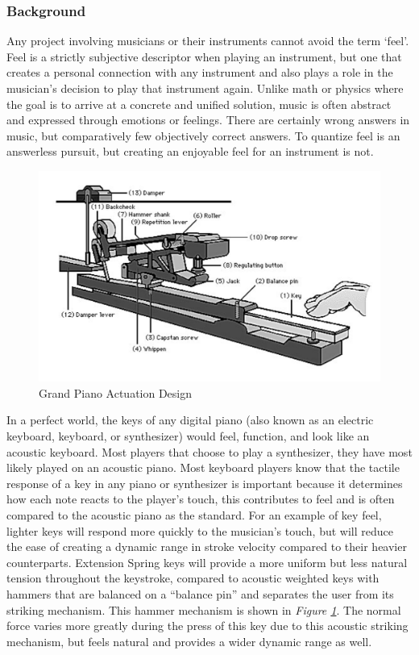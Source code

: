 \subsubsection{Background}

Any project involving musicians or their instruments cannot avoid the term ‘feel’. Feel is a strictly subjective descriptor when playing an instrument, but one that creates a personal connection with any instrument and also plays a role in the musician’s decision to play that instrument again. Unlike math or physics where the goal is to arrive at a concrete and unified solution, music is often abstract and expressed through emotions or feelings. There are certainly wrong answers in music, but comparatively few objectively correct answers. To quantize feel is an answerless pursuit, but creating an enjoyable feel for an instrument is not.

\begin{figure}[h!]
  \centering
  \includegraphics[width=\linewidth]{image/KeyMechanism.png}
  \caption{Grand Piano Actuation Design}
  \label{fig:key_mechanism}
\end{figure}

In a perfect world, the keys of any digital piano (also known as an electric keyboard, keyboard, or synthesizer) would feel, function, and look like an acoustic keyboard. Most players that choose to play a synthesizer, they have most likely played on an acoustic piano. Most keyboard players know that the tactile response of a key in any piano or synthesizer is important because it determines how each note reacts to the player’s touch, this contributes to feel and is often compared to the acoustic piano as the standard. For an example of key feel, lighter keys will respond more quickly to the musician's touch, but will reduce the ease of creating a dynamic range in stroke velocity compared to their heavier counterparts. Extension Spring keys will provide a more uniform but less natural tension throughout the keystroke, compared to acoustic weighted keys with hammers that are balanced on a “balance pin” and separates the user from its striking mechanism. This hammer mechanism is shown in \textit{Figure \ref{fig:key_mechanism}}. The normal force varies more greatly during the press of this key due to this acoustic striking mechanism, but feels natural and provides a wider dynamic range as well.

